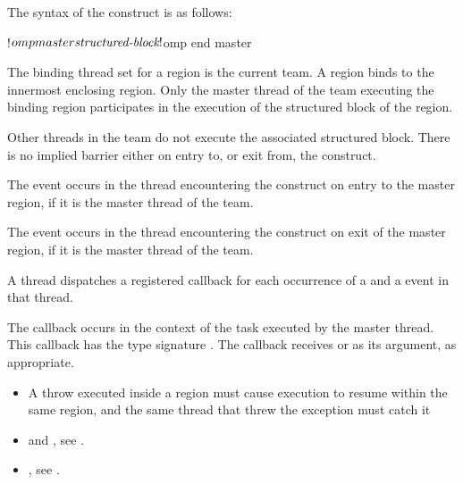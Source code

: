 \begin{fortranspecific}
The syntax of the  construct is as follows:

\begin{ompfPragma}
!$omp master
   \plc{structured-block}
!$omp end master
\end{ompfPragma}
\end{fortranspecific}

\binding
The binding thread set for a  region is the current team. A  region
binds to the innermost enclosing  region. Only the master thread of the team
executing the binding  region participates in the execution of the structured
block of the  region.

\descr
Other threads in the team do not execute the associated structured block. There is no
implied barrier either on entry to, or exit from, the  construct.

\events

The  event occurs in the thread encountering the 
construct on entry to the master region, if it is the master thread of the team.

The  event occurs in the thread encountering the 
construct on exit of the master region, if it is the master thread of the team.

\tools

A thread dispatches a registered 
callback for each occurrence of a  and a
 event in that thread.

The callback occurs  in the context of the task executed by the master thread.
This callback has the type signature
. The callback receives
 or 
as its  argument, as appropriate.

\restrictions
\begin{cppspecific}
\begin{itemize}
\item A throw executed inside a  region must cause execution to resume within the
same  region, and the same thread that threw the exception must catch it
\end{itemize}
\end{cppspecific}

\crossreferences
\begin{itemize}

\item {} and , see
.

\item {}, see
.


\end{itemize}

